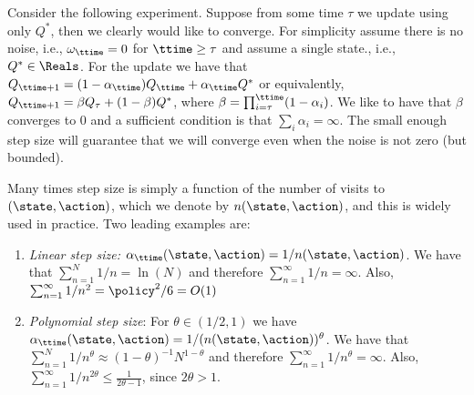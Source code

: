 Consider the following experiment. Suppose from some time $\tau$
we update using only $Q^*$, then we clearly would like to converge.
For simplicity assume there is no noise, i.e., $\omega_\ttime=0$ for
$\ttime\geq\tau$ and assume a single state., i.e., $Q^*\in \Reals$.
For the update we have that $Q_{\ttime+1}=(1-\alpha_\ttime)Q_\ttime
+\alpha_\ttime Q^*$ or equivalently, $Q_{\ttime+1}=\beta
Q_\tau+(1-\beta)Q^*$, where $\beta=
\prod_{i=\tau}^\ttime(1-\alpha_i)$. We like to have that $\beta$
converges to $0$ and a sufficient condition is that
$\sum_i\alpha_i=\infty$.
%
%
%
The small enough step size will guarantee that we will converge even
when the noise is not zero (but bounded).

Many times step size is simply a function of the number of visits
to $(\state,\action)$, which we denote by $n(\state,\action)$, and
this is widely used in practice. Two leading examples are:
\begin{enumerate}
\item
{\em Linear step size:}
$\alpha_\ttime(\state,\action)=1/n(\state,\action)$. We have that
$\sum_{n=1}^N 1/n=\ln(N)$ and therefore $\sum_{n=1}^\infty
1/n=\infty$. Also, $\sum_{n=1}^\infty 1/n^2=\policy^2/6=O(1)$
\item
{\em Polynomial step size}: For $\theta\in(1/2,1)$ we have
$\alpha_\ttime(\state,\action)=1/(n(\state,\action))^\theta$. We
have that $\sum_{n=1}^N 1/n^\theta\approx
(1-\theta)^{-1}N^{1-\theta}$ and therefore $\sum_{n=1}^\infty
1/n^\theta=\infty$. Also, $\sum_{n=1}^\infty 1/n^{2\theta} \leq
\frac{1}{2\theta-1}$, since $2\theta>1$.
\end{enumerate}

